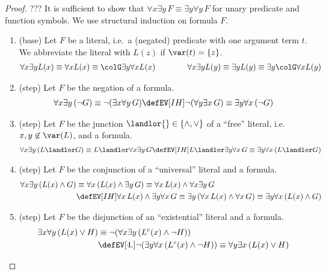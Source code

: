 \begin{proof} ??? It is sufficient to show
	that \( \forall x\exists y\,F\equiv\exists y\forall y\,F \)
	for unary predicate and function symbols.
	We use structural induction on formula \( F \).
	\begin{enumerate}
		\item (base) Let \( F \) be a literal,
		i.e.~a (negated) predicate with one argument term \( t \).
		We abbreviate the literal with \( L(z) \) if \( \var(t) = \{ z \} \).
		\begin{gather*}
			\forall x \exists y L(x)  \equiv \forall x L(x) \equiv {\colG \exists y} \forall x L(x)
			\qquad\qquad
			\forall x \exists y L(y)  \equiv \exists y L(y) \equiv \exists y{\colG \forall x}  L(y)
		\end{gather*}
		\item (step) Let \( F \) be the negation of a formula.
		\begin{gather*}
		\forall x \exists y\, (\lnot G)
		\equiv \lnot (\exists x \forall y\, G)
		\defEV[IH] \lnot (\forall y\exists x \, G)
		\equiv \exists y \forall x\, (\lnot G)
		\end{gather*}
		\item (step) Let \( F \) be the junction \( \landlor{}\in\{\land,\lor\} \) of a “free” literal, i.e.~\( x,y\not\in\var(L) \), and a formula.
		\begin{gather*}
		\forall x\exists y\,( L \landlor G)
		\equiv L \landlor \forall x\exists y\, G
		\defEV[IH]L \landlor \exists y\forall x\, G
		\equiv\exists y\forall x\,( L \landlor G )
		\end{gather*}
		\item (step) Let \( F \) be the conjunction of a “universal” literal and a formula.
		\begin{align*}
		\forall x \exists y\,({L(x)\land G})
		&\equiv \forall x\,({L(x)} \land \exists y\,G)
		\equiv \forall x\,L(x)\land \forall x\exists y\,G
		\\&\defEV[IH] \forall x\,{L(x)} \land \exists y\forall x\,G
		\equiv\exists y\,(\forall x\,L(x)\land \forall x\,G)
		\equiv\exists y \forall x\,({L(x)\land G})
		\end{align*}
		\item (step) Let \( F \) be the disjunction of an “existential” literal and a formula.
		\begin{align*}
		\exists x \forall y\,(L(x)\lor H)
		&\equiv \lnot(\forall x\exists y\,(L^c(x)\land \lnot H)) \\
		&\defEV[4.]\lnot( \exists y\forall x\,(L^c(x)\land \lnot H) )
		\equiv \forall y \exists x\,(L(x)\lor H)
		\end{align*}



\end{enumerate}
\end{proof}
